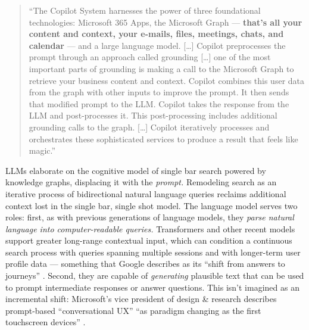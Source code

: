 \begin{quote}
``The Copilot System harnesses the power of three foundational
technologies: Microsoft 365 Apps, the Microsoft Graph --- \textbf{that's
all your content and context, your e-mails, files, meetings, chats, and
calendar} --- and a large language model. {[}\ldots{]} Copilot
preprocesses the prompt through an approach called grounding
{[}\ldots{]} one of the most important parts of grounding is making a
call to the Microsoft Graph to retrieve your business content and
context. Copilot combines this user data from the graph with other
inputs to improve the prompt. It then sends that modified prompt to the
LLM. Copilot takes the response from the LLM and post-processes it. This
post-processing includes additional grounding calls to the graph.
{[}\ldots{]} Copilot iteratively processes and orchestrates these
sophisticated services to produce a result that feels like magic.'' \cite{microsoftFutureWorkAI2023} 
\end{quote}

LLMs elaborate on the cognitive model of single bar search powered by
knowledge graphs, displacing it with the \emph{prompt.} Remodeling
search as an iterative process of bidirectional natural language queries
reclaims additional context lost in the single bar, single shot model.
The language model serves two roles: first, as with previous generations
of language models, they \emph{parse natural language into
computer-readable queries.} Transformers and other recent models support
greater long-range contextual input, which can condition a continuous
search process with queries spanning multiple sessions \cite{maChallengesSupportingExploratory2020a}  and with longer-term user
profile data --- something that Google describes as its ``shift from
answers to journeys'' \cite{gomesImprovingSearchNext2018, konzelmannChattingYourGoogle2018} . Second, they are capable of
\emph{generating} plausible text that can be used to prompt intermediate
responses or answer questions. This isn't imagined as an incremental
shift: Microsoft's vice president of design \& research describes
prompt-based ``conversational UX'' ``as paradigm changing as the first
touchscreen devices'' \cite{friedmanBehindtheDesignMeetCopilot2023} .

